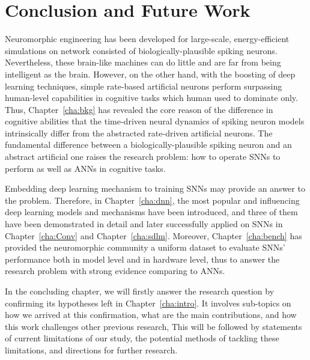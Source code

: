 \chapter{Conclusion and Future Work}
\label{cha:conc}
Neuromorphic engineering has been developed for large-scale, energy-efficient simulations on network consisted of biologically-plausible spiking neurons.
Nevertheless, these brain-like machines can do little and are far from being intelligent as the brain.
However, on the other hand, with the boosting of deep learning techniques, simple rate-based artificial neurons perform surpassing human-level capabilities in cognitive tasks which human used to dominate only. 
Thus, Chapter~\ref{cha:bkg} has revealed the core reason of the difference in cognitive abilities that the time-driven neural dynamics of spiking neuron models  intrinsically differ from the abstracted rate-driven artificial neurons.
The fundamental difference between a biologically-plausible spiking neuron and an abstract artificial one raises the research problem: how to operate SNNs to perform as well as ANNs in cognitive tasks.

Embedding deep learning mechanism to training SNNs may provide an answer to the problem.
Therefore, in Chapter~\ref{cha:dnn}, the most popular and influencing deep learning models and mechanisms have been introduced, and three of them have been demonstrated in detail and later successfully applied on SNNs in Chapter~\ref{cha:Conv} and Chapter~\ref{cha:sdlm}.
Moreover, Chapter~\ref{cha:bench} has provided the neuromorphic community a uniform dataset to evaluate SNNs' performance both in model level and in hardware level, thus to answer the research problem with strong evidence comparing to ANNs.

In the concluding chapter, we will firstly answer the research question by confirming its hypotheses left in Chapter~\ref{cha:intro}.
It involves sub-topics on how we arrived at this confirmation, what are the main contributions, and how this work challenges other previous research, 
This will be followed by statements of current limitations of our study, the potential methods of tackling these limitations, and directions for further research.



